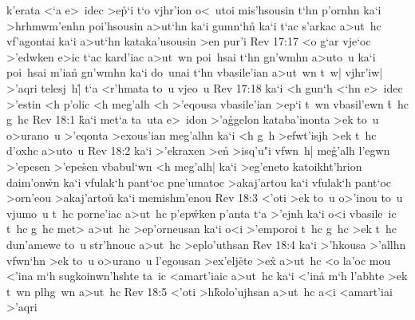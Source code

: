 k'erata
<`a
e>~idec
>e\r{p}`i
t`o
vjhr'ion
o<~utoi
mis'hsousin
t`hn
p'ornhn
ka`i
>hrhmwm'enhn
poi'hsousin
a>ut`hn
ka`i
gumn`h\r{n}
ka`i
t`ac
s'arkac
a>ut~hc
vf'agontai
ka`i
a>ut`hn
kataka'usousin
>en
pur'i\bibvsend
\vs Rev 17:17
<o
g`ar
vje`oc
>'edwken
e>ic
t`ac
kard'iac
a>ut~wn
poi~hsai
t`hn
gn'wmhn
a>uto~u
ka`i
poi~hsai
m'ian\r{}
gn'wmhn
ka`i
do~unai
t`hn
vbasile'ian
a>ut~wn
t~w|
vjhr'iw|
>'aqri
telesj~h|\r{}
t`a
<r'hmata
to~u
vjeo~u\bibvsend
\vs Rev 17:18
ka`i
<h
gun`h
<`hn
e>~idec
>'estin
<h
p'olic
<h
meg'alh
<h
>'eqousa
vbasile'ian
>ep`i
t~wn
vbasil'ewn
\r{t}~hc
g~hc\bibvsend
\vs Rev 18:1
\r{k}a`i
met`a
ta~uta
e>~idon
>'a\r{g}gelon
kataba'inonta
>ek
to~u
o>urano~u
>'eqonta
>exous'ian
meg'alhn
ka`i
<h
g~h
>efwt'isjh
>ek
t~hc
d'oxhc
a>uto~u\bibvsend
\vs Rev 18:2
ka`i
>'ekraxen
>en\r{}
>isq'u"i
vfwn~h|
me\r{g}'alh
l'egwn
>'epesen
>'epe\r{s}en
vbabul`wn
<h
meg'alh|
ka`i
>eg'eneto
katoikht'hrion
daim'on\r{w}n
ka`i
vfulak`h
pant`oc
pne'umatoc
>akaj'artou
ka`i
vfulak`h
pant`oc
>orn'eou
>akaj'arto\r{u}
ka`i
memishm'enou\bibvsend
\vs Rev 18:3
<'oti
>ek
to~u
o>'inou
to~u
vjumo~u
t~hc
porne'iac
a>ut~hc
p'ep\r{w}ken
p'anta
t`a
>'ejnh
ka`i
o<i
vbasile~ic
t~hc
g~hc
met>
a>ut~hc
>ep'orneusan
ka`i
o<i
>'emporoi
t~hc
g~hc
>ek
t~hc
dun'amewc
to~u
str'hnouc
a>ut~hc
>eplo'uthsan\bibvsend
\vs Rev 18:4
ka`i
>'hkousa
>'allhn
vfwn`hn
>ek
to~u
o>urano~u
l'egousan
>ex'elj\r{e}te
>ex\r{}
a>ut~hc
<o
la'oc
mou
<'ina
m`h
sugkoinwn'hshte
ta~ic
<amart'iaic
a>ut~hc
ka`i
<'ina\r{}
m`h
l'abhte
>ek
t~wn
plhg~wn
a>ut~hc\bibvsend
\vs Rev 18:5
<'oti
>h\r{k}olo'ujhsan
a>ut~hc
a<i
<amart'iai
>'aqri
